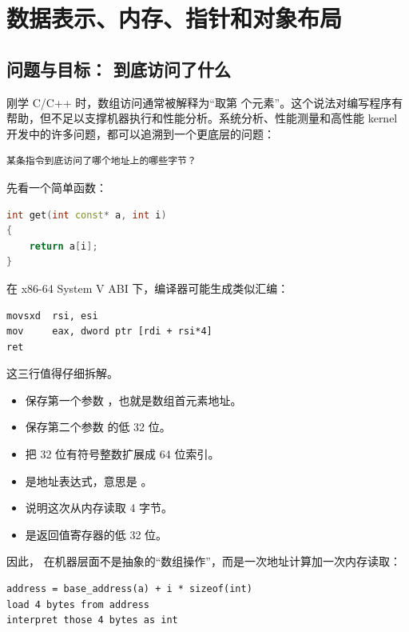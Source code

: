 \chapter{数据表示、内存、指针和对象布局}

\section{问题与目标： 到底访问了什么}

刚学 C/C++ 时，数组访问通常被解释为“取第  个元素”。这个说法对编写程序有帮助，但不足以支撑机器执行和性能分析。系统分析、性能测量和高性能 kernel 开发中的许多问题，都可以追溯到一个更底层的问题：

\begin{lstlisting}
某条指令到底访问了哪个地址上的哪些字节？
\end{lstlisting}

先看一个简单函数：

\begin{lstlisting}[language=C++]
int get(int const* a, int i)
{
    return a[i];
}
\end{lstlisting}

在 x86-64 System V ABI 下，编译器可能生成类似汇编：

\begin{lstlisting}
movsxd  rsi, esi
mov     eax, dword ptr [rdi + rsi*4]
ret
\end{lstlisting}

这三行值得仔细拆解。

\begin{itemize}
  \item {} 保存第一个参数 ，也就是数组首元素地址。
  \item {} 保存第二个参数  的低 32 位。
  \item {} 把 32 位有符号整数扩展成 64 位索引。
  \item {} 是地址表达式，意思是 。
  \item {} 说明这次从内存读取 4 字节。
  \item {} 是返回值寄存器的低 32 位。
\end{itemize}

因此， 在机器层面不是抽象的“数组操作”，而是一次地址计算加一次内存读取：

\begin{lstlisting}
address = base_address(a) + i * sizeof(int)
load 4 bytes from address
interpret those 4 bytes as int
\end{lstlisting}

